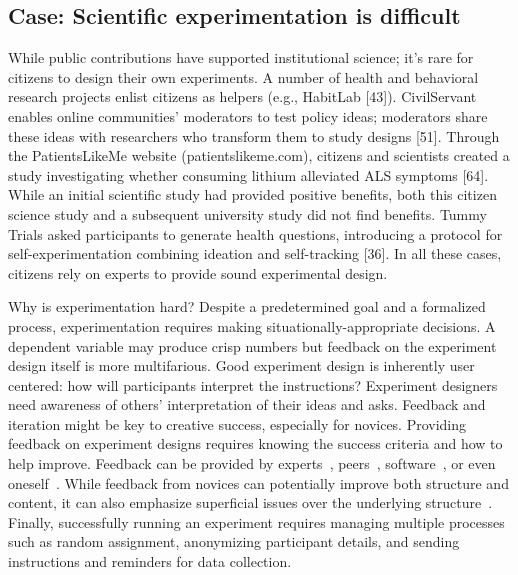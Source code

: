 \subsection {Case: Scientific experimentation is difficult}
While public contributions have supported institutional science; it’s rare for citizens to design
their own experiments. A number of health and behavioral research projects enlist citizens as helpers (e.g., HabitLab [43]). 
CivilServant enables online communities’ 
moderators to test policy ideas; moderators share these ideas with researchers who transform 
them to study designs [51]. Through the PatientsLikeMe website (patientslikeme.com), citizens 
and scientists created a study investigating whether consuming lithium alleviated ALS symptoms [64]. 
While an initial scientific study had provided positive benefits, both this citizen science study and 
a subsequent university study did not find benefits. Tummy Trials asked 
participants to generate health questions, introducing a protocol for self-experimentation 
combining ideation and self-tracking [36]. In all these cases, citizens rely on experts to provide sound experimental design.

Why is experimentation hard?  Despite a predetermined goal and a formalized process, experimentation
requires making situationally-appropriate decisions. A dependent variable may produce crisp
numbers but feedback on the experiment design itself is more multifarious. Good experiment
design is inherently user centered: how will participants interpret the instructions? Experiment
designers need awareness of others’ interpretation of their ideas and asks. Feedback and iteration
might be key to creative success, especially for novices. Providing feedback on experiment
designs requires knowing the success criteria and how to
help improve.  Feedback can be provided by experts~\cite{dow2012shepherding, schon1984reflective}, peers~\cite{Boud1995, Kulkarni2015b}, software~\cite{Dantoni2015, Head2017}, or even oneself~\cite{Boud1995,schon1984reflective}. While feedback from novices can
potentially improve both structure and content, it can also emphasize superficial issues over the
underlying structure~\cite{chi1981expertise}. Finally, successfully running an experiment
requires managing multiple processes such as random
assignment, anonymizing participant details, and sending
instructions and reminders for data collection.


